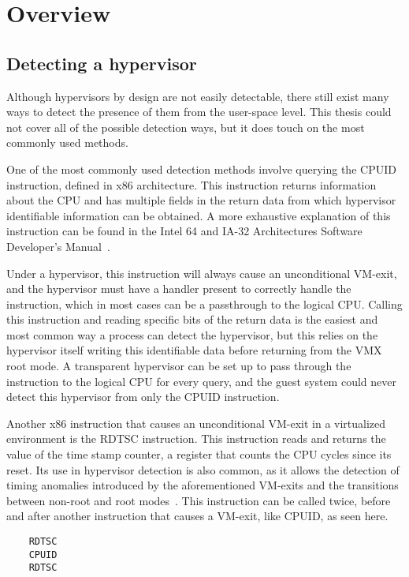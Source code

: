 \section{Overview}\label{s:overview}

\subsection{Detecting a hypervisor}\label{HV_detection}

Although hypervisors by design are not easily detectable, there still exist many ways to detect the presence of them from the user-space level. 
This thesis could not cover all of the possible detection ways, but it does touch on the most commonly used methods.

One of the most commonly used detection methods involve querying the CPUID instruction, defined in x86 architecture. 
This instruction returns information about the CPU and has multiple fields in the return data from which hypervisor identifiable information can be obtained. 
A more exhaustive explanation of this instruction can be found in the Intel\textsuperscript{\tiny\textregistered} 64 and IA-32 Architectures Software Developer's Manual~\cite[Volume~2A]{Intel-SDM2025}. 

Under a hypervisor, this instruction will always cause an unconditional VM-exit, and the hypervisor must have a handler present to correctly handle the instruction, 
which in most cases can be a passthrough to the logical CPU. Calling this instruction and reading specific bits of the return data is the easiest 
and most common way a process can detect the hypervisor, but this relies on the hypervisor itself writing this identifiable data before returning from the VMX root mode. 
A transparent hypervisor can be set up to pass through the instruction to the logical CPU for every query, and the guest system could never detect this hypervisor from only the CPUID instruction.

Another x86 instruction that causes an unconditional VM-exit in a virtualized environment is the RDTSC instruction. This instruction reads and returns the value of the time stamp counter, 
a register that counts the CPU cycles since its reset. Its use in hypervisor detection is also common, as it allows the detection of timing anomalies introduced by the aforementioned VM-exits 
and the transitions between non-root and root modes~\cite{hyperdbg-transparency}. This instruction can be called twice, before and after another instruction that causes a VM-exit, like CPUID, as seen here.
\begin{verbatim}
    RDTSC
    CPUID
    RDTSC
\end{verbatim}

